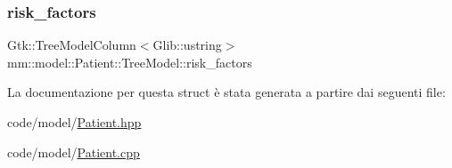 \subsubsection{\texorpdfstring{risk\+\_\+factors}{risk\_factors}}
{\footnotesize\ttfamily Gtk\+::\+Tree\+Model\+Column$<$Glib\+::ustring$>$ mm\+::model\+::\+Patient\+::\+Tree\+Model\+::risk\+\_\+factors}



La documentazione per questa struct è stata generata a partire dai seguenti file\+:\begin{DoxyCompactItemize}
\item 
code/model/\hyperlink{_patient_8hpp}{Patient.\+hpp}\item 
code/model/\hyperlink{_patient_8cpp}{Patient.\+cpp}\end{DoxyCompactItemize}
